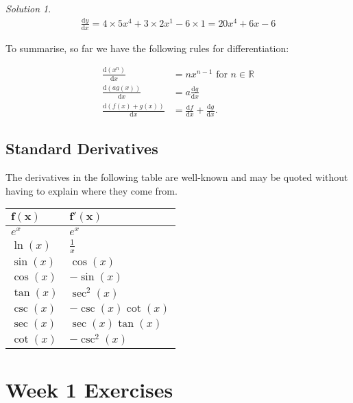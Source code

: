 \documentclass[
  english,
  11pt,
  oneside]{book}
\newcommand{\slide}{}
\theoremstyle{definition}
\theoremstyle{definition}
\theoremstyle{definition}
\theoremstyle{definition}
\theoremstyle{remark}
\newtheorem*{solution}{Solution}
\begin{document}
\begin{solution}
\begin{gather*}
\frac{\mathrm{d} y}{\mathrm{d} x} = 4\times5x^4 + 3\times 2x^1 - 6\times1 = 20x^4+6x-6
\end{gather*}
\end{solution}

\slide

To summarise, so far we have the following rules for differentiation:

\begin{align*}
\frac{\mathrm{d}(x^n)}{\mathrm{d} x} &= nx^{n-1}\text{ for }n\in{\mathbb R}\\
\frac{\mathrm{d}(ag(x))}{\mathrm{d} x} &= a\frac{\mathrm{d} g}{\mathrm{d} x}\\
\frac{\mathrm{d}(f(x)+g(x))}{\mathrm{d} x} &= \frac{\mathrm{d} f}{\mathrm{d} x}+\frac{\mathrm{d} g}{\mathrm{d} x}.
\end{align*}
\slide

\section{Standard Derivatives}\label{standard-derivatives}

The derivatives in the following table are well-known and may be quoted without having to explain where they come from.

\begin{longtable}[]{@{}ll@{}}
\toprule\noalign{}
\(\mathbf{f(x)}\) & \(\mathbf{f'(x)}\) \\
\midrule\noalign{}
\endhead
\bottomrule\noalign{}
\endlastfoot
\(e^x\) & \(e^x\) \\
\(\ln(x)\) & \(\frac{1}{x}\) \\
\(\sin(x)\) & \(\cos(x)\) \\
\(\cos(x)\) & \(-\sin(x)\) \\
\(\tan(x)\) & \(\sec^2(x)\) \\
\(\csc(x)\) & \(-\csc(x)\cot(x)\) \\
\(\sec(x)\) & \(\sec(x)\tan(x)\) \\
\(\cot(x)\) & \(-\csc^2(x)\) \\
\end{longtable}

\chapter*{Week 1 Exercises}\label{week-1-exercises}
\end{document}

